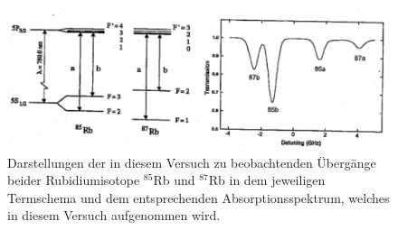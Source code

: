 \FloatBarrier
\begin{figure}[!h]
\centering
\includegraphics[scale=1]{../Grafiken/Absorptionsspektrum_Termschema.pdf}
\caption{Darstellungen der in diesem Versuch zu 
	beobachtenden Übergänge beider Rubidiumisotope 
	${}^{85}$Rb und ${}^{87}$Rb in dem jeweiligen 
	Termschema und dem entsprechenden 
	Absorptionsspektrum, welches in diesem Versuch aufgenommen wird.
	\label{fig:absorptionsspektrum_termschema}}
\end{figure}
\FloatBarrier